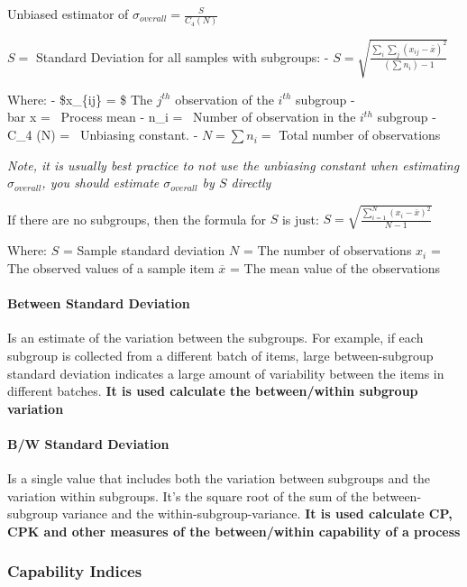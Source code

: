 \documentclass[11pt]{article}
\begin{document}
Unbiased estimator of \(\sigma_{overall} = \frac{S}{C_4(N)}\)

\(S =\) Standard Deviation for all samples with subgroups: -
\(S = \sqrt{\frac{\sum_i \sum_j (x_{ij} - \bar{x})^2}{(\sum n_i) - 1}}\)

Where: - \$x\_\{ij\} = \$ The \(j^{th}\) observation of the \(i^{th}\)
subgroup - \\bar x = \ Process mean - n\_i = \ Number of
observation in the \(i^{th}\) subgroup - C\_4 (N) = \ Unbiasing
constant. - \(N = \sum n_i =\) Total number of observations

\emph{Note, it is usually best practice to not use the unbiasing
constant when estimating \(\sigma_{overall}\), you should estimate
\(\sigma_{overall}\) by \(S\) directly}

If there are no subgroups, then the formula for \(S\) is just:
\(S = \sqrt{\frac{\sum^N_{i=1} (x_i - \bar x)^2}{N-1}}\)

Where: \(S\) = Sample standard deviation \(N\) = The number of
observations \(x_i\) = The observed values of a sample item
\(\overline {x}\) = The mean value of the observations

\hypertarget{between-standard-deviation}{%
\paragraph{Between Standard
Deviation}\label{between-standard-deviation}}

Is an estimate of the variation between the subgroups. For example, if
each subgroup is collected from a different batch of items, large
between-subgroup standard deviation indicates a large amount of
variability between the items in different batches. \textbf{It is used
calculate the between/within subgroup variation}

\hypertarget{bw-standard-deviation}{%
\paragraph{B/W Standard Deviation}\label{bw-standard-deviation}}

Is a single value that includes both the variation between subgroups and
the variation within subgroups. It's the square root of the sum of the
between-subgroup variance and the within-subgroup-variance. \textbf{It
is used calculate CP, CPK and other measures of the between/within
capability of a process}

    \hypertarget{capability-indices}{%
\subsubsection{Capability Indices}\label{capability-indices}}
\end{document}
